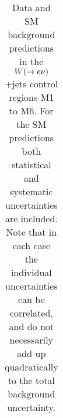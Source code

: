 \begin{table}[!ht]
\begin{center}
\begin{small}
\begin{tabular*}{\textwidth}{@{\extracolsep{\fill}}lrrr}
    \hline \hline

    \end{tabular*}
    \end{small}

    \end{center}
    \caption[Data and SM background predictions in the $\wen$+jets control regions M1 to M6.]
{Data and SM background predictions in the $\wen$+jets control regions M1 to M6. 
      For the SM predictions both statistical and systematic uncertainties are included.
        Note that in each case the individual 
        uncertainties can be correlated, and do not necessarily add up quadratically to the total background uncertainty.
    }
\label{tab:ControlRegion_CRele}
\end{table}
